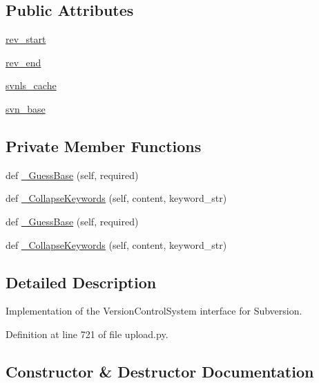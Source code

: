 \subsection*{Public Attributes}
\begin{DoxyCompactItemize}
\item 
\hyperlink{classupload_1_1SubversionVCS_ad1553a69f4a790309273dbdeb9077732}{rev\+\_\+start}
\item 
\hyperlink{classupload_1_1SubversionVCS_ac0bb07a099c722b7f8622de4b225904f}{rev\+\_\+end}
\item 
\hyperlink{classupload_1_1SubversionVCS_aa801782f807674b06f491df5d7ca9942}{svnls\+\_\+cache}
\item 
\hyperlink{classupload_1_1SubversionVCS_a60645c40d2fea4cd52881576bd13341f}{svn\+\_\+base}
\end{DoxyCompactItemize}
\subsection*{Private Member Functions}
\begin{DoxyCompactItemize}
\item 
def \hyperlink{classupload_1_1SubversionVCS_ad257205675d7d9d291145f4aa405964b}{\+\_\+\+Guess\+Base} (self, required)
\item 
def \hyperlink{classupload_1_1SubversionVCS_ab484ddd61e217927fb61639bacdbb68d}{\+\_\+\+Collapse\+Keywords} (self, content, keyword\+\_\+str)
\item 
def \hyperlink{classupload_1_1SubversionVCS_ad257205675d7d9d291145f4aa405964b}{\+\_\+\+Guess\+Base} (self, required)
\item 
def \hyperlink{classupload_1_1SubversionVCS_ab484ddd61e217927fb61639bacdbb68d}{\+\_\+\+Collapse\+Keywords} (self, content, keyword\+\_\+str)
\end{DoxyCompactItemize}


\subsection{Detailed Description}
\begin{DoxyVerb}Implementation of the VersionControlSystem interface for Subversion.\end{DoxyVerb}
 

Definition at line 721 of file upload.\+py.



\subsection{Constructor \& Destructor Documentation}
\mbox{\label{classupload_1_1SubversionVCS_a8333f94e27335ce83eed0cc3f5a1eeb0}} 
